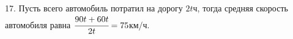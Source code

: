 17. Пусть всего автомобиль потратил на дорогу $2t$ч, тогда средняя скорость автомобиля равна $\cfrac{90t+60t}{2t}=75$км/ч.\\
